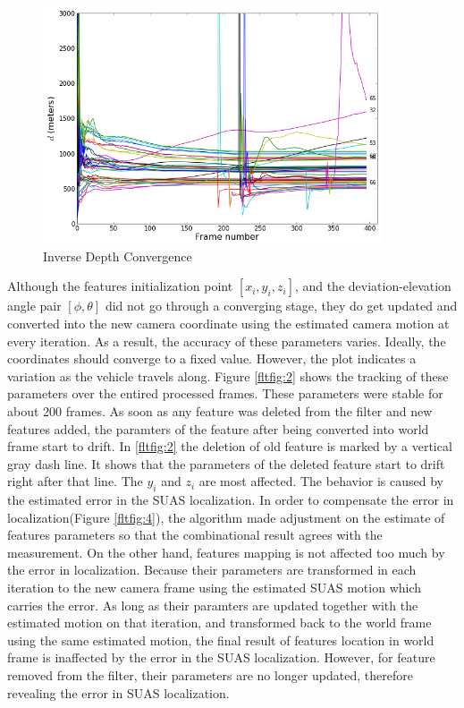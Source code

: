 \begin{figure}[h]
\centering
\includegraphics[width=10cm, keepaspectratio=true]{./Figures/fltfig/cut1/Figure10.png}
\caption{Inverse Depth Convergence}
\label{fltfig:1}
\end{figure}

Although the features initialization point $[x_i, y_i, z_i]$, and the
deviation-elevation angle pair $[\phi, \theta]$ did not go through a
converging stage, they do get updated and converted into the new
camera coordinate using the estimated camera motion at every
iteration. As a result, the accuracy of these parameters varies.
Ideally, the coordinates should converge to a fixed value. However,
the plot indicates a variation as the vehicle travels along. Figure
\ref{fltfig:2} shows the tracking of these parameters over the entired
processed frames.
These parameters were stable for about 200 frames. As soon as any
feature was deleted from the filter and new features added, the
paramters of the feature after being converted into world
frame start to drift. In \ref{fltfig:2} the deletion of old feature is
marked by a vertical gray dash line. It shows that the parameters of
the deleted feature start to drift right after that line. The $y_i$
and $z_i$ are most affected. The behavior is caused by the estimated
error in the SUAS localization. In order to compensate the error in
localization(Figure \ref{fltfig:4}), the algorithm made adjustment on the
estimate of  features parameters so that the combinational result
agrees with the measurement. On the other hand, features mapping is
not affected too much by the error in localization. Because their
parameters are transformed in each iteration to the new camera frame
using the estimated SUAS motion which carries the error. As long as
their paramters are updated together with the estimated motion on that
iteration, and transformed back to the world frame using the same
estimated motion, the final result of features location in world frame
is inaffected by the error in the SUAS localization. However, for
feature removed from the filter, their parameters are no longer
updated, therefore revealing the error in SUAS localization. 

